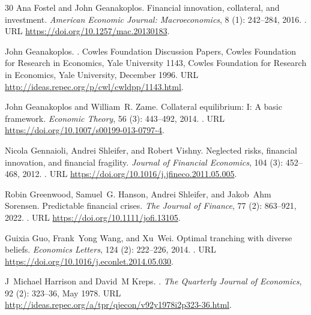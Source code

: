 \documentclass[11pt]{article}
\theoremstyle{plain}
\begin{document}
\begin{thebibliography}{30}
Ana Fostel and John Geanakoplos.
\newblock Financial innovation, collateral, and investment.
\newblock \emph{American Economic Journal: Macroeconomics}, 8
  (1): 242--284, 2016.
\newblock {}.
\newblock URL \url{https://doi.org/10.1257/mac.20130183}.

John Geanakoplos.
.
\newblock Cowles Foundation Discussion Papers, Cowles Foundation for Research
  in Economics, Yale University 1143, Cowles Foundation for Research in
  Economics, Yale University, December 1996.
\newblock URL \url{http://ideas.repec.org/p/cwl/cwldpp/1143.html}.

John Geanakoplos and William~R. Zame.
\newblock Collateral equilibrium: I: A basic framework.
\newblock \emph{Economic Theory}, 56 (3): 443--492, 2014.
\newblock {}.
\newblock URL \url{https://doi.org/10.1007/s00199-013-0797-4}.

Nicola Gennaioli, Andrei Shleifer, and Robert Vishny.
\newblock Neglected risks, financial innovation, and financial fragility.
\newblock \emph{Journal of Financial Economics}, 104 (3):
  452--468, 2012.
\newblock {}.
\newblock URL \url{https://doi.org/10.1016/j.jfineco.2011.05.005}.

Robin Greenwood, Samuel~G. Hanson, Andrei Shleifer, and Jakob~Ahm Sorensen.
\newblock Predictable financial crises.
\newblock \emph{The Journal of Finance}, 77 (2): 863--921,
  2022.
\newblock {}.
\newblock URL \url{https://doi.org/10.1111/jofi.13105}.

Guixia Guo, Frank~Yong Wang, and Xu~Wei.
\newblock Optimal tranching with diverse beliefs.
\newblock \emph{Economics Letters}, 124 (2): 222--226, 2014.
\newblock {}.
\newblock URL \url{https://doi.org/10.1016/j.econlet.2014.05.030}.

J~Michael Harrison and David~M Kreps.
.
\newblock \emph{The Quarterly Journal of Economics}, 92 (2):
  323--36, May 1978.
\newblock URL \url{http://ideas.repec.org/a/tpr/qjecon/v92y1978i2p323-36.html}.


\end{thebibliography}
\end{document}
